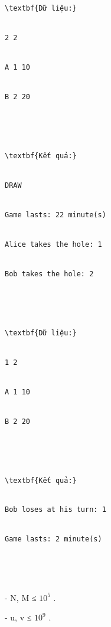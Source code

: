 \begin{verbatim}
\textbf{Dữ liệu:}


2 2


A 1 10


B 2 20





\textbf{Kết quả:}


DRAW


Game lasts: 22 minute(s)


Alice takes the hole: 1


Bob takes the hole: 2





\textbf{Dữ liệu:}


1 2


A 1 10


B 2 20





\textbf{Kết quả:}


Bob loses at his turn: 1


Game lasts: 2 minute(s)





\end{verbatim}
- N, M ≤ $10^{5}$   .   


   - u, v ≤ $10^{9}$   .